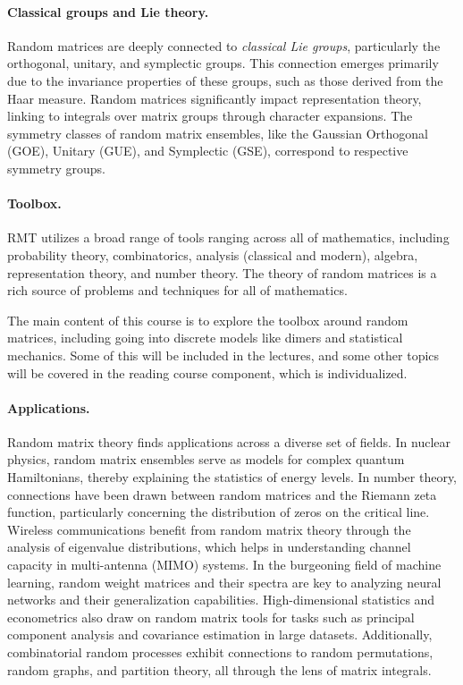 \documentclass[letterpaper,11pt,oneside,reqno]{article}
\numberwithin{equation}{section}
\theoremstyle{definition}
\begin{document}
\paragraph{Classical groups and Lie theory.}
Random matrices are deeply connected to \emph{classical Lie groups}, particularly the orthogonal, unitary, and symplectic groups. This connection emerges primarily due to the invariance properties of these groups, such as those derived from the Haar measure.
Random matrices significantly impact representation theory, linking to integrals over matrix groups through character expansions. The symmetry classes of random matrix ensembles, like the Gaussian Orthogonal (GOE), Unitary (GUE), and Symplectic (GSE), correspond to respective symmetry groups.

\paragraph{Toolbox.}
RMT utilizes a broad range of tools ranging across all of mathematics, including probability theory, combinatorics, analysis (classical and modern), algebra, representation theory, and number theory.
The theory of random matrices is a rich source of problems and techniques for all of mathematics.

The main content of this course is to explore the toolbox
around random matrices, including going into discrete models
like dimers and statistical mechanics. Some of this will be included
in the lectures, and some other topics will be covered in the
reading course component, which is individualized.

\paragraph{Applications.}
Random matrix theory finds applications across a diverse set
of fields. In nuclear physics, random matrix ensembles serve
as models for complex quantum Hamiltonians, thereby
explaining the statistics of energy levels. In number
theory, connections have been drawn between random matrices
and the Riemann zeta function, particularly concerning the
distribution of zeros on the critical line. Wireless
communications benefit from random matrix theory through the
analysis of eigenvalue distributions, which helps in
understanding channel capacity in multi-antenna (MIMO) systems. In the burgeoning field of
machine learning, random weight matrices and their spectra
are key to analyzing neural networks and their
generalization capabilities. High-dimensional statistics
and econometrics
also draw on random matrix tools for tasks such as principal
component analysis and covariance estimation in large
datasets. Additionally, combinatorial random processes
exhibit connections to random permutations, random graphs,
and partition theory, all through the lens of matrix
integrals.
\end{document}
